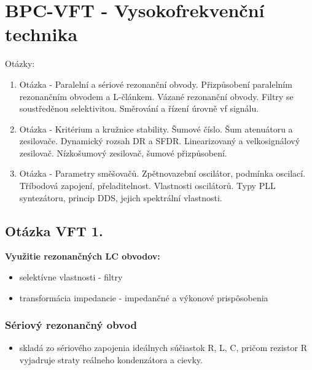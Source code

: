 \part{BPC-VFT - Vysokofrekvenční technika }

{\huge Otázky:}

\begin{enumerate}
	\item Otázka - Paralelní a sériové rezonanční obvody. Přizpůsobení paralelním rezonančním obvodem a L-článkem. Vázané rezonanční obvody. Filtry se soustředěnou selektivitou. Směrování a řízení úrovně vf signálu. 
	\item Otázka - Kritérium a kružnice stability. Šumové číslo. Šum atenuátoru a zesilovače. Dynamický rozsah DR a SFDR. Linearizovaný a velkosignálový zesilovač. Nízkošumový zesilovač, šumové přizpůsobení. 
	\item Otázka - Parametry směšovačů. Zpětnovazební oscilátor, podmínka oscilací. Tříbodová zapojení, přeladitelnost. Vlastnosti oscilátorů. Typy PLL syntezátoru, princip DDS, jejich spektrální vlastnosti.
	
\end{enumerate}

\newpage
	
\chapter{Otázka VFT 1.}
	\textbf{Využitie rezonančných LC obvodov:}
	\begin{itemize}[label=$\rightarrow$]
		\item selektívne vlastnosti - filtry
		\item transformácia impedancie - impedančné a výkonové prispôsobenia
	\end{itemize}
	
	\section{Sériový rezonančný obvod}
	\begin{itemize}[label=--]
		\item skladá zo sériového zapojenia ideálnych súčiastok R, L, C, pričom rezistor R vyjadruje straty reálneho kondenzátora a cievky.
	\end{itemize}
	
